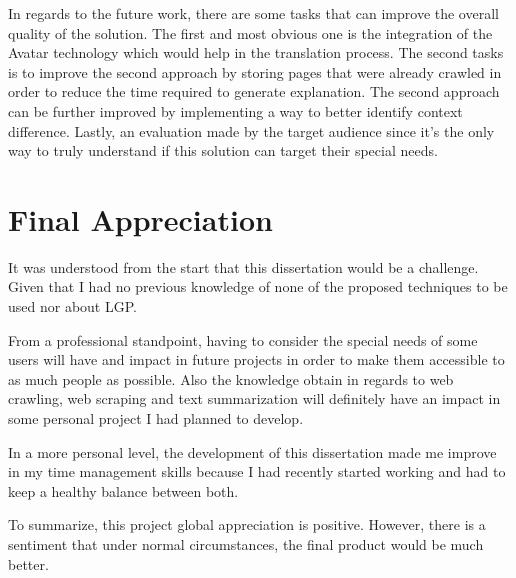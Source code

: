 In regards to the future work, there are some tasks that can improve the overall quality of the solution.
The first and most obvious one is the integration of the Avatar technology which would help in the translation process.
The second tasks is to improve the second approach by storing pages that were already crawled in order to reduce the time required to generate explanation.
The second approach can be further improved by implementing a way to better identify context difference.
Lastly, an evaluation made by the target audience since it's the only way to truly understand if this solution can target their special needs.

\section{Final Appreciation}

It was understood from the start that this dissertation would be a challenge.
Given that I had no previous knowledge of none of the proposed techniques to be used nor about \gls{LGP}.

From a professional standpoint, having to consider the special needs of some users will have and impact in future projects in order to make them accessible to as much people as possible.
Also the knowledge obtain in regards to web crawling, web scraping and text summarization will definitely have an impact in some personal project I had planned to develop.

In a more personal level, the development of this dissertation made me improve in my time management skills because I had recently started working and had to keep a healthy balance between both.

To summarize, this project global appreciation is positive.
However, there is a sentiment that under normal circumstances, the final product would be much better.
